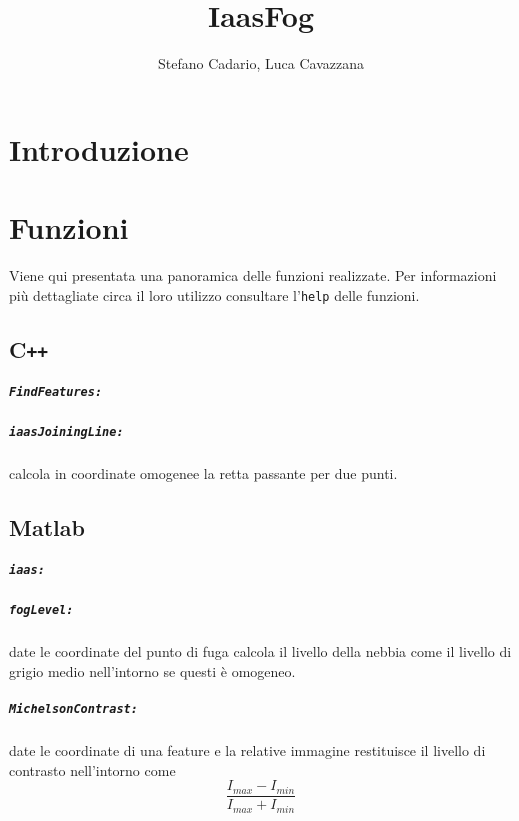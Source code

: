 \documentclass[12pt]{report}
\title {IaasFog}
\author{Stefano Cadario, Luca Cavazzana}
\begin{document}
\maketitle

\tableofcontents

\chapter{Introduzione}

\chapter{Funzioni}

Viene qui presentata una panoramica delle funzioni realizzate. Per informazioni pi\`u dettagliate circa il loro utilizzo consultare l'\verb|help| delle funzioni.

\section[C++]{C\verb_++_}

\paragraph*{\verb_FindFeatures:_}

\paragraph*{\verb_iaasJoiningLine:_} calcola in coordinate omogenee la retta passante per due punti.

\section{Matlab}

\paragraph*{\verb_iaas:_}

\paragraph*{\verb_fogLevel:_} date le coordinate del punto di fuga calcola il livello della nebbia come il livello di grigio medio nell'intorno se questi \`e omogeneo.

\paragraph*{\verb_MichelsonContrast:_} date le coordinate di una feature e la relative immagine restituisce il livello di contrasto nell'intorno come $$\frac{I_{max}-I_{min}}{I_{max}+I_{min}}$$
\end{document}
